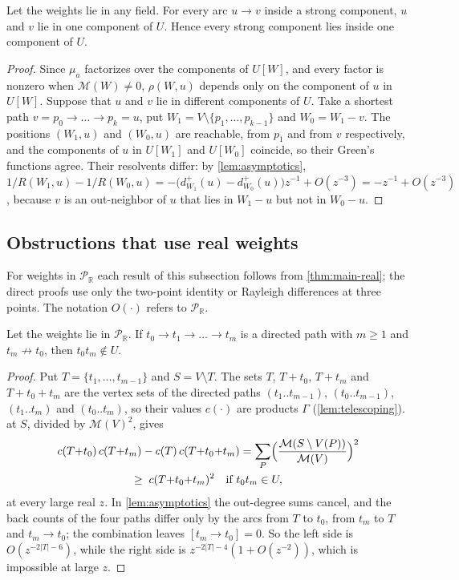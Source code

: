 \documentclass[final]{siamart0516}
\numberwithin{theorem}{section}
\numberwithin{equation}{section}
\theoremstyle{siamnonum}
\theoremstyle{plain}
\newcommand{\RR}{\mathbb{R}}
\newcommand{\Puis}{\mathcal{P}_{\RR}}
\newcommand{\Mpot}{\mathcal{M}}           %
\begin{document}
\begin{theorem}[locality]\label{thm:locality}
Let the weights lie in any field. For every arc $u\to v$ inside a strong component, $u$ and $v$ lie in one component of $U$. Hence every strong component lies inside one component of $U$.
\end{theorem}
\begin{proof}
Since $\mu_a$ factorizes over the components of $U[W]$, and every factor is nonzero when $\Mpot(W)\neq0$, $\rho(W,u)$ depends only on the component of $u$ in $U[W]$. Suppose that $u$ and $v$ lie in different components of $U$. Take a shortest path $v=p_0\to\dots\to p_k=u$, put $W_1=V\setminus\{p_1,\dots,p_{k-1}\}$ and $W_0=W_1-v$. The positions $(W_1,u)$ and $(W_0,u)$ are reachable, from $p_1$ and from $v$ respectively, and the components of $u$ in $U[W_1]$ and $U[W_0]$ coincide, so their Green's functions agree. Their resolvents differ: by \cref{lem:asymptotics}, $1/R(W_1,u)-1/R(W_0,u)=-\bigl(d^{+}_{W_1}(u)-d^{+}_{W_0}(u)\bigr)z^{-1}+O(z^{-3})=-z^{-1}+O(z^{-3})$, because $v$ is an out-neighbor of $u$ that lies in $W_1-u$ but not in $W_0-u$.
\end{proof}

\subsection{Obstructions that use real weights}
For weights in $\Puis$ each result of this subsection follows from \cref{thm:main-real}; the direct proofs use only the two-point identity or Rayleigh differences at three points. The notation $O(\cdot)$ refers to $\Puis$.

\begin{proposition}\label{prop:path-lemma}
Let the weights lie in $\Puis$. If $t_0\to t_1\to\dots\to t_m$ is a directed path with $m\ge1$ and $t_m\not\to t_0$, then $t_0t_m\notin U$.
\end{proposition}
\begin{proof}
Put $T=\{t_1,\dots,t_{m-1}\}$ and $S=V\setminus T$. The sets $T$, $T+t_0$, $T+t_m$ and $T+t_0+t_m$ are the vertex sets of the directed paths $(t_1..t_{m-1})$, $(t_0..t_{m-1})$, $(t_1..t_m)$ and $(t_0..t_m)$, so their values $c(\cdot)$ are products $\Gamma$ (\cref{lem:telescoping}).  at $S$, divided by $\Mpot(V)^2$, gives
\begin{multline*}
c(T{+}t_0)\,c(T{+}t_m)-c(T)\,c(T{+}t_0{+}t_m)=\sum_{P}\Bigl(\frac{\Mpot(S\setminus V(P))}{\Mpot(V)}\Bigr)^{2}\\
\ge\;c(T{+}t_0{+}t_m)^{2}\quad\text{if }t_0t_m\in U,
\end{multline*}
at every large real $z$. In \cref{lem:asymptotics} the out-degree sums cancel, and the back counts of the four paths differ only by the arcs from $T$ to $t_0$, from $t_m$ to $T$ and $t_m\to t_0$; the combination leaves $[t_m\to t_0]=0$. So the left side is $O(z^{-2|T|-6})$, while the right side is $z^{-2|T|-4}(1+O(z^{-2}))$, which is impossible at large $z$.
\end{proof}
\end{document}
